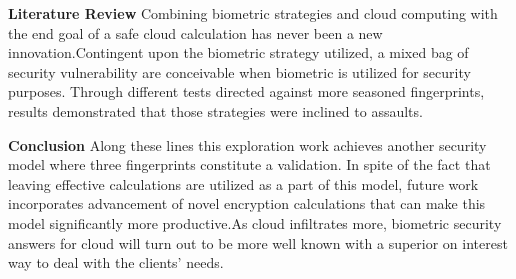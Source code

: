 \documentclass[12pt]{article}
\begin{document}
\textbf{\large Literature Review} \newline \newline
Combining biometric strategies and cloud computing with the end goal of a safe cloud calculation has never been a new innovation.Contingent upon the biometric strategy utilized, a mixed bag of security vulnerability are conceivable when biometric is utilized for security purposes. Through different tests directed against more seasoned fingerprints, results demonstrated that those strategies were inclined to assaults. \newline \newline

\textbf{\large Conclusion} \newline \newline
Along these lines this exploration work achieves another security model where three fingerprints constitute a validation. In spite of the fact that leaving effective calculations are utilized as a part of this model, future work incorporates advancement of novel encryption calculations that can make this model significantly more productive.As cloud infiltrates more, biometric security answers for cloud will turn out to be more well known with a superior on interest way to deal with the clients' needs.
\end{document}
